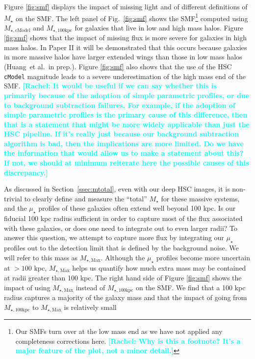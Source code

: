 \documentclass[a4paper,fleqn,usenatbib]{mnras}
\def\etal{{\ et al.~}}
\def\ser{{S\'{e}rsic\ }}
\def\mstar{{$M_{\star}$}}
\def\mtot{{$M_{\star,100\mathrm{kpc}}$}}
\def\mmax{{$M_{\star,\mathrm{Max}}$}}
\def\mcmodel{{$M_{\star,\mathrm{cModel}}$}}
\def\mden{{$\mu_{\star}$}}
\newcommand{\rachel}[1]{\textcolor{cyan}{\textbf{[Rachel: #1]}}}
\begin{document}
     Figure \ref{fig:smf} displays the impact of missing light and of different definitions of \mstar{} on the SMF. The left panel of Fig.~\ref{fig:smf} shows the SMF\footnote{Our SMFs turn over at the low mass end as we have not applied any completeness corrections here. \rachel{Why is this a footnote?  It's a major feature of the plot, not a minor detail.}} computed using \mcmodel{} and \mtot{} for galaxies that live in low and high mass halos.  Figure \ref{fig:smf} shows that the impact of missing flux is more severe for  galaxies in high mass halos. In Paper II it will be demonstrated that this occurs because  galaxies in more massive halos have larger extended  wings than those in low mass halos (Huang\etal in prep.). Figure \ref{fig:smf} also shows that  the use of the HSC \texttt{cModel} magnitude leads to a severe underestimation of the  high mass end of the SMF. 
\rachel{It would be useful if we can say whether this is primarily because of the adoption of simple parametric profiles, or due to background subtraction failures.  For example, if the adoption of simple parametric profiles is the primary cause of this difference, then that is a statement that might be more widely applicable than just the HSC pipeline.  If it's really just because our background subtraction algorithm is bad, then the implications are more limited.  Do we have the information that would allow us to make a statement about this?  If not, we should at minimum reiterate here the possible causes of this discrepancy.}

    
    
    
        As discussed in Section~\ref{ssec:mtotal}, even with our deep HSC images,
    it is non-trivial to clearly define and measure the ``total'' \mstar{} for 
    these massive systems, and the \mden{} profiles of these galaxies often extend 
    well beyond 100 kpc. Is our fiducial 100 kpc radius sufficient in order to capture  most of the flux associated with these galaxies, or does one need to integrate out to even larger radii? To answer this question,  we attempt to capture more flux by integrating our \mden{} profiles out to the detection 
    limit that is defined by the background noise. We will refer to this mass as \mmax{}. Although the \mden{} profiles become more uncertain at $>100$ kpc, \mmax{} helps us quantify how much extra mass may be contained at radii greater than 100 kpc.  The right hand side of Figure \ref{fig:smf} shows the impact of using \mmax{} instead of  \mtot{} on the SMF.  We find that  a 100 kpc radius captures a majority of the galaxy mass and that the impact of going from \mtot{} to \mmax{} is relatively small
    
\end{document}
